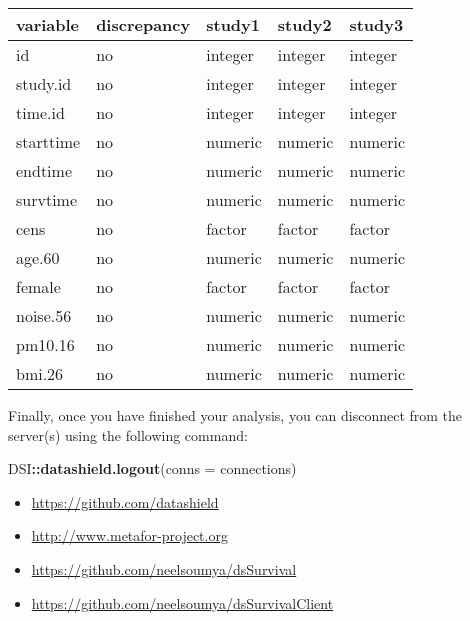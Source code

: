 \documentclass[
]{article}
\newenvironment{Shaded}{\begin{snugshade}}{\end{snugshade}}
\newcommand{\DataTypeTok}[1]{\textcolor[rgb]{0.13,0.29,0.53}{#1}}
\newcommand{\KeywordTok}[1]{\textcolor[rgb]{0.13,0.29,0.53}{\textbf{#1}}}
\newcommand{\NormalTok}[1]{#1}
\newcommand{\OperatorTok}[1]{\textcolor[rgb]{0.81,0.36,0.00}{\textbf{#1}}}
\begin{document}
\begin{longtable}[]{@{}lllll@{}}
\toprule
variable & discrepancy & study1 & study2 & study3\tabularnewline
\midrule
\endhead
id & no & integer & integer & integer\tabularnewline
study.id & no & integer & integer & integer\tabularnewline
time.id & no & integer & integer & integer\tabularnewline
starttime & no & numeric & numeric & numeric\tabularnewline
endtime & no & numeric & numeric & numeric\tabularnewline
survtime & no & numeric & numeric & numeric\tabularnewline
cens & no & factor & factor & factor\tabularnewline
age.60 & no & numeric & numeric & numeric\tabularnewline
female & no & factor & factor & factor\tabularnewline
noise.56 & no & numeric & numeric & numeric\tabularnewline
pm10.16 & no & numeric & numeric & numeric\tabularnewline
bmi.26 & no & numeric & numeric & numeric\tabularnewline
\bottomrule
\end{longtable}

Finally, once you have finished your analysis, you can disconnect from
the server(s) using the following command:

\begin{Shaded}
\begin{Highlighting}[]
\NormalTok{DSI}\OperatorTok{::}\KeywordTok{datashield.logout}\NormalTok{(}\DataTypeTok{conns =}\NormalTok{ connections)}
\end{Highlighting}
\end{Shaded}

\newpage

\begin{itemize}
\item
  \url{https://github.com/datashield}
\item
  \url{http://www.metafor-project.org}
\item
  \url{https://github.com/neelsoumya/dsSurvival}
\item
  \url{https://github.com/neelsoumya/dsSurvivalClient}
\end{itemize}
\end{document}
